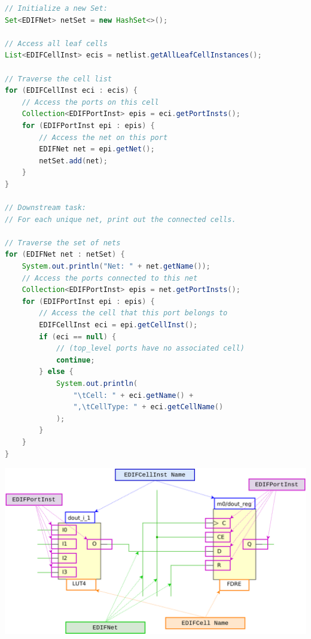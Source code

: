 \begin{multicols}{2}
\begin{lstlisting}[language=java, caption={Netlist extraction and traversal}, label={lst:netlist_extract}]
// Initialize a new Set:
Set<EDIFNet> netSet = new HashSet<>();

// Access all leaf cells
List<EDIFCellInst> ecis = netlist.getAllLeafCellInstances();

// Traverse the cell list
for (EDIFCellInst eci : ecis) {
    // Access the ports on this cell
    Collection<EDIFPortInst> epis = eci.getPortInsts();
    for (EDIFPortInst epi : epis) {
        // Access the net on this port
        EDIFNet net = epi.getNet();
        netSet.add(net);
    }
}

// Downstream task:
// For each unique net, print out the connected cells.

// Traverse the set of nets
for (EDIFNet net : netSet) {
    System.out.println("Net: " + net.getName());
    // Access the ports connected to this net
    Collection<EDIFPortInst> epis = net.getPortInsts();
    for (EDIFPortInst epi : epis) {
        // Access the cell that this port belongs to
        EDIFCellInst eci = epi.getCellInst();
        if (eci == null) {
            // (top_level ports have no associated cell)
            continue;
        } else {
            System.out.println(
                "\tCell: " + eci.getName() + 
                ",\tCellType: " + eci.getCellName()
            );
        }
    }
}
\end{lstlisting}

{
    \centering
    \includegraphics[valign=c, width=\columnwidth]{figures/traversal.png}
    \label{fig:traversal}
}
\vspace{0.5cm}


\end{multicols}

